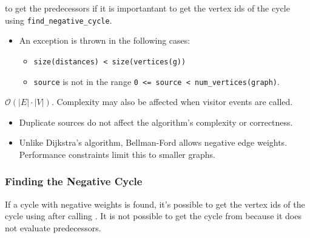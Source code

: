 \begin{itemdescr}
\begin{itemize}
                  to get the predecessors if it is importantant to get the vertex ids of the cycle
                  using \lstinline{find_negative_cycle}.
      \end{itemize}
\pnum\throws 
            \begin{itemize}
                  \item An  exception is thrown in the following cases:
                        \begin{itemize}
                              \item \lstinline{size(distances) < size(vertices(g))}
                              \item \lstinline{source} is not in the range \lstinline{0 <= source < num_vertices(graph)}.
                        \end{itemize}
            \end{itemize}
      \pnum\complexity $\mathcal{O}(|E| \cdot |V|)$. Complexity may also be affected when visitor events are called. \\
      \pnum\remarks 
            \begin{itemize}
                  \item Duplicate sources do not affect the algorithm's complexity or correctness.
                  \item Unlike Dijkstra's algorithm, Bellman-Ford allows negative edge weights. 
                        Performance constraints limit this to smaller graphs.
            \end{itemize}
\end{itemdescr}

\subsubsection{Finding the Negative Cycle}
If a cycle with negative weights is found, it's possible to get the vertex ids of the cycle
using  after calling . It is
not possible to get the cycle from  because it does
not evaluate predecessors.


